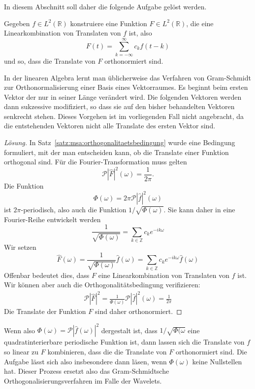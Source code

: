 
In diesem Abschnitt soll daher die folgende Aufgabe gelöst werden.
\begin{aufgabe}
\label{aufgabe:orthonormalisierung}
Gegeben $f\in L^2(\mathbb R)$ konstruiere eine Funktion 
$F\in L^2(\mathbb R)$, die eine Linearkombination von 
Translaten von $f$ ist, also
\[
F(t) = \sum_{k=-\infty}^\infty c_k f(t-k)
\]
und so, dass die Translate von $F$ orthonormiert sind.
\end{aufgabe}

In der linearen Algebra lernt man üblicherweise das Verfahren von
Gram-Schmidt zur Orthonormalisierung einer Basis eines Vektorraumes.
Es beginnt beim ersten Vektor der nur in seiner Länge verändert wird.
Die folgenden Vektoren werden dann sukzessive modifiziert, so dass sie
auf den bisher behandelten Vektoren senkrecht stehen.
Dieses Vorgehen ist im vorliegenden Fall nicht angebracht, da die
entstehenden Vektoren nicht alle Translate des ersten Vektor sind.

\begin{proof}[Lösung]
In Satz~\ref{satz:msa:orthogonalitaetsbedingung} wurde eine Bedingung
formuliert, mit der man entscheiden kann, ob die Translate einer 
Funktion orthogonal sind.
Für die Fourier-Transformation muss gelten
\[
\mathcal{P}|\hat{F}|^2(\omega)
=
\frac{1}{2\pi}.
\]
Die Funktion 
\[
\Phi(\omega)
=
2\pi\mathcal{P}|\hat{f}|^2(\omega)
\]
ist $2\pi$-periodisch, also auch die Funktion $1/\sqrt{\Phi(\omega)}$.
Sie kann daher in eine Fourier-Reihe entwickelt werden
\[
\frac{1}{\sqrt{\Phi(\omega)}}
=
\sum_{k\in\mathbb Z} c_ke^{-ik\omega}
\]
Wir setzen 
\[
\hat{F}(\omega)
=
\frac{1}{\sqrt{\Phi(\omega)}} 
\hat{f}(\omega)
=
\sum_{k\in\mathbb Z} c_ke^{-ik\omega}\hat{f}(\omega)
\]
Offenbar bedeutet dies, dass $F$ eine Linearkombination von Translaten
von $f$ ist.
Wir können aber auch die Orthogonalitätsbedingung verifizieren:
\begin{align*}
\mathcal{P}|\hat{F}|^2
=
\frac{1}{\Phi(\omega)} \mathcal{P}|\hat{f}|^2(\omega)
=
\frac{1}{2\pi}
\end{align*}
Die Translate der Funktion $F$ sind daher orthonormiert.
\end{proof}

Wenn also
$\Phi(\omega)=\mathcal{P}|\hat{f}(\omega)|^2$ dergestalt ist, dass 
$1/\sqrt{\Phi(\omega}$ eine quadratinterierbare periodische Funktion ist,
dann lassen sich die Translate von $f$ so linear zu $F$ kombinieren, dass die
die Translate von $F$ orthonormiert sind.
Die Aufgabe lässt sich also insbesondere dann läsen, wenn $\Phi(\omega)$
keine Nullstellen hat.
Dieser Prozess ersetzt also das Gram-Schmidtsche Orthogonalisierungsverfahren
im Falle der Wavelets.





